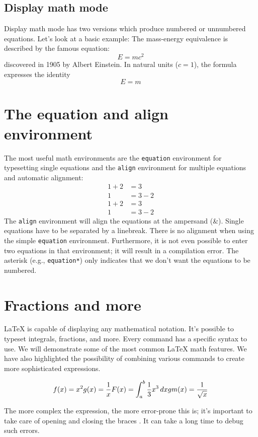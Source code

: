 \documentclass{article}
\begin{document}
\subsection{Display math mode}
Display math mode has two versions which produce numbered or unnumbered equations. Let’s look at a basic example:
The mass-energy equivalence is described by the famous equation:
\[E = mc^2\]
discovered in 1905 by Albert Einstein. In natural units (\(c = 1\)), the formula expresses the identity
\[E = m\]

\section{The equation and align environment}
The most useful math environments are the \texttt{equation} environment for typesetting single equations and the \texttt{align} environment for multiple equations and automatic alignment:
\begin{align}
1 + 2 &= 3 \\
1 &= 3 - 2 \\
1 + 2 &= 3 \\
1 &= 3 - 2
\end{align}
The \texttt{align} environment will align the equations at the ampersand (\&). Single equations have to be separated by a linebreak. There is no alignment when using the simple \texttt{equation} environment. Furthermore, it is not even possible to enter two equations in that environment; it will result in a compilation error. The asterisk (e.g., \texttt{equation*}) only indicates that we don’t want the equations to be numbered.

\section{Fractions and more}
LaTeX is capable of displaying any mathematical notation. It’s possible to typeset integrals, fractions, and more. Every command has a specific syntax to use. We will demonstrate some of the most common LaTeX math features. We have also highlighted the possibility of combining various commands to create more sophisticated expressions.




\[
f(x) = x^2 \\
g(x) = \frac{1}{x} \\
F(x) = \int_{a}^{b} \frac{1}{3} x^3 \, dx \\
gm(x) = \frac{1}{\sqrt{x}}
\]

The more complex the expression, the more error-prone this is; it’s important to take care of opening and closing the braces {}. It can take a long time to debug such errors.
\end{document}

